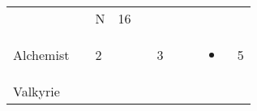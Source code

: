 \documentclass[12pt]{article}
\newcommand{\indexClass}[1]{\index{#1}}
\newcommand{\class}[1]{#1\indexClass{#1}}
\begin{document}
\begin{longtable}[]{@{}llllllllll@{}}
\begin{minipage}[t]{0.06\columnwidth}
\strut\end{minipage} &
\begin{minipage}[t]{0.06\columnwidth}\raggedright\strut
\strut\end{minipage} &
\begin{minipage}[t]{0.07\columnwidth}\raggedright\strut
N
\strut\end{minipage} &
\begin{minipage}[t]{0.08\columnwidth}\raggedright\strut
16
\strut\end{minipage}\tabularnewline
\begin{minipage}[t]{0.13\columnwidth}\raggedright\strut
\class{Alchemist}
\strut\end{minipage} &
\begin{minipage}[t]{0.06\columnwidth}\raggedright\strut
\strut\end{minipage} &
\begin{minipage}[t]{0.06\columnwidth}\raggedright\strut
2
\strut\end{minipage} &
\begin{minipage}[t]{0.06\columnwidth}\raggedright\strut
\strut\end{minipage} &
\begin{minipage}[t]{0.06\columnwidth}\raggedright\strut
\strut\end{minipage} &
\begin{minipage}[t]{0.06\columnwidth}\raggedright\strut
3
\strut\end{minipage} &
\begin{minipage}[t]{0.06\columnwidth}\raggedright\strut
\strut\end{minipage} &
\begin{minipage}[t]{0.06\columnwidth}\raggedright\strut
\strut\end{minipage} &
\begin{minipage}[t]{0.07\columnwidth}\raggedright\strut
\begin{itemize}
\item
\end{itemize}
\strut\end{minipage} &
\begin{minipage}[t]{0.08\columnwidth}\raggedright\strut
5
\strut\end{minipage}\tabularnewline
\begin{minipage}[t]{0.13\columnwidth}\raggedright\strut
\class{Valkyrie}
\strut\end{minipage} &
\begin{minipage}[t]{0.06\columnwidth}\raggedright\strut

\end{minipage}
\end{longtable}
\end{document}

